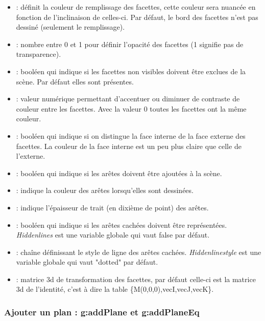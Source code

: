     \begin{itemize}
        \item {} : définit la couleur de remplissage des facettes, cette couleur sera nuancée en fonction de l'inclinaison de celles-ci. Par défaut, le bord des facettes n'est pas dessiné (seulement le remplissage).
        \item {} : nombre entre 0 et 1 pour définir l'opacité des facettes (1 signifie pas de transparence).
        \item {} : booléen qui indique si les facettes non visibles doivent être exclues de la scène. Par défaut elles sont présentes.
        \item {} : valeur numérique permettant d'accentuer ou diminuer de contraste de couleur entre les facettes. Avec la valeur 0 toutes les facettes ont la même couleur.
        \item {} : booléen qui indique si on distingue la face interne de la face externe des facettes. La couleur de la face interne est un peu plus claire que celle de l'externe.
        
        \item {} : booléen qui indique si les arêtes doivent être ajoutées à la scène.
        \item {} : indique la couleur des arêtes lorsqu'elles sont dessinées.
        \item {} : indique l'épaisseur de trait (en dixième de point) des arêtes.
        \item {} : booléen qui indique si les arêtes cachées doivent être représentées. \emph{Hiddenlines} est une variable globale qui vaut false par défaut.
        \item {} : chaîne définissant le style de ligne des arêtes cachées. \emph{Hiddenlinestyle} est une variable globale qui vaut "dotted" par défaut.
        \item {} : matrice 3d de transformation des facettes, par défaut celle-ci est la matrice 3d de l'identité, c'est à dire la table \{M(0,0,0),vecI,vecJ,vecK\}.
    \end{itemize}

\subsubsection{Ajouter un plan : g:addPlane et g:addPlaneEq}

